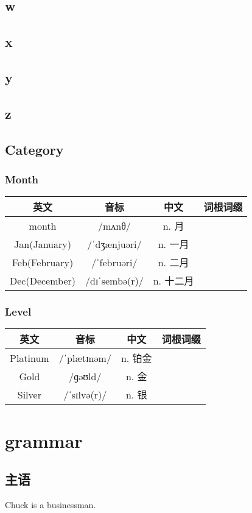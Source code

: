 \documentclass[12pt,twiside,a4paper]{ctexbook}
\numberwithin{chapter}{part}
\begin{document}
\section{w}
\section{x}
\section{y}
\section{z}

\section{Category}
\subsection{Month}
\begin{tabular}{|c|c|c|c|}
\hline
英文 & 音标 & 中文 & 词根词缀\\
\hline
month & /mʌnθ/ & n. 月 & \\
\hline
Jan(January) & /ˈdʒænjuəri/ & n. 一月 & \\
Feb(February) & /ˈfebruəri/ & n. 二月 & \\
Dec(December) & /dɪˈsembə(r)/ & n. 十二月 & \\
\hline
\end{tabular}

\subsection{Level}
\begin{tabular}{|c|c|c|c|}
\hline
英文 & 音标 & 中文 & 词根词缀\\
\hline
Platinum & /ˈplætɪnəm/ & n. 铂金 & \\
Gold & /ɡəʊld/ & n. 金 & \\
Silver & /ˈsɪlvə(r)/ & n. 银 & \\
\hline
\end{tabular}

\chapter{grammar}
\section{主语}
Chuck is a businessman.
\end{document}
